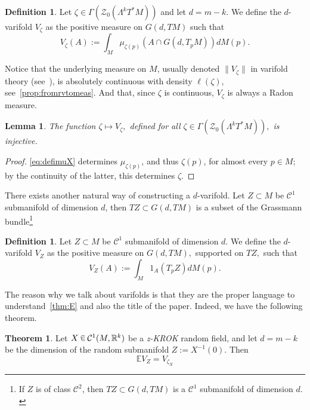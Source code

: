 \documentclass[10pt]{amsart}
\newtheorem{lemm}[theo]{Lemma}\newtheorem{prop}[theo]{Proposition}\newtheorem{coro}[theo]{Corollary}\newtheorem{conj}[theo]{Conjecture}
\theoremstyle{definition}\newtheorem{defi}[theo]{Definition}\newtheorem{rema}[theo]{Remark}\newtheorem{exam}[theo]{Example}\newtheorem{exem}[theo]{Example}\newtheorem{nota}[theo]{Notation}
\newtheorem{mainthm}{Theorem}
\newcommand{\R}{\mathbb{R}}
\newcommand{\EE}{\mathbb{E}}
\newcommand{\ZZ}{\mathscr{Z}}
\newcommand{\mC}{\mathcal{C}}
\newcommand{\zkrok}{\emph{z-KROK}\xspace}
\newcommand*\randin{
\mathchoice {\raisebox{-.35ex}{$\displaystyle{^\subset}$}\mkern-11.5mu\raisebox{+.45ex}{$\displaystyle{_\subset}$}} {\mkern+1mu\raisebox{-.27ex}{$\textstyle{^\subset}$}\mkern-11.7mu\raisebox{+.45ex}{$\textstyle{_\subset}$}} {\raisebox{.35ex}{$\scriptstyle\subset$}\mkern-14mu\raisebox{-.15ex}{$\scriptstyle\subset$}} {\raisebox{.3ex}{$\scriptscriptstyle\subset$}\mkern-13.5mu\raisebox{-.10ex}{$\scriptscriptstyle\subset$}}}
\begin{document}
\begin{defi}
Let $\zeta\in \Gamma(\ZZ_0(\Lambda^kT^*M))$ and let $d=m-k$. We define the $d$-varifold $V_{\zeta}$ as the positive measure on $G(d,TM)$ such that
\begin{equation}\label{eq:defimuX}
V_{\zeta}(A):=\int_M\mu_{\zeta(p)}\left( A\cap G\left(d,T_pM\right)\right) dM(p).
\end{equation}
\end{defi}

Notice that the underlying measure on $M$, usually denoted $\|V_{\zeta}\|$ in varifold theory (see~\cite{Allard1972Varifold}), is absolutely continuous with density $\ell(\zeta)$, see~\cref{prop:fromrvtomeas}. And that, since $\zeta$ is continuous, $V_\zeta$ is always a Radon measure.

\begin{lemm}\label{lem:zonoidvarifold}
The function $\zeta\mapsto V_\zeta,$ defined for all $\zeta\in\Gamma(\ZZ_0(\Lambda^kT^*M)),$ is injective.
\end{lemm}

\begin{proof}
\eqref{eq:defimuX} determines $\mu_{\zeta(p)}$, and thus $\zeta(p)$, for almost every $p\in M$; by the continuity of the latter, this determines $\zeta$.
\end{proof}

There exists another natural way of constructing a $d$-varifold. Let $Z\subset M$ be $\mC^1$ submanifold of dimension $d$, then $TZ\subset G(d,TM)$ is a subset of the Grassmann bundle\footnote{If $Z$ is of class $\mC^2$, then $TZ\subset G(d,TM)$ is a $\mC^1$ submanifold of dimension $d.$}

\begin{defi}
Let $Z\subset M$ be $\mC^1$ submanifold of dimension $d$. We define the $d$-varifold $V_{Z}$ as the positive measure on $G(d,TM),$ supported on $TZ,$ such that
\begin{equation*}
V_{Z}(A):=\int_M 1_A(T_pZ)dM(p).
\end{equation*}
\end{defi}

The reason why we talk about varifolds is that they are the proper language to understand~\cref{thm:E} and also the title of the paper. Indeed, we have the following theorem.

\begin{mainthm}\label{thm:title}
Let $X\,\randin\, \mC^1(M,\R^k)$ be a \zkrok random field, and let $d=m-k$ be the dimension of the random submanifold $Z:=X^{-1}(0).$ Then
\begin{equation*}
\EE V_Z=V_{\zeta_X}
\end{equation*}
\end{mainthm}
\end{document}

